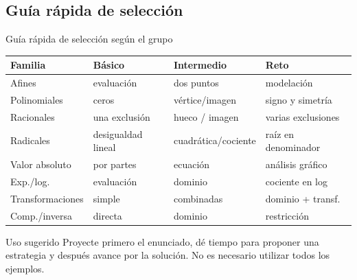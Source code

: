 \documentclass[aspectratio=169,10pt]{beamer}
\begin{document}
\subsection*{Guía rápida de selección}
\begin{frame}{Guía rápida de selección según el grupo}
\small
\begin{tabular}{p{}p{}p{}p{}}
\toprule
\textbf{Familia} & \textbf{Básico} & \textbf{Intermedio} & \textbf{Reto}\\
\midrule
Afines & evaluación & dos puntos & modelación\\
Polinomiales & ceros & vértice/imagen & signo y simetría\\
Racionales & una exclusión & hueco / imagen & varias exclusiones\\
Radicales & desigualdad lineal & cuadrática/cociente & raíz en denominador\\
Valor absoluto & por partes & ecuación & análisis gráfico\\
Exp./log. & evaluación & dominio & cociente en log\\
Transformaciones & simple & combinadas & dominio + transf.\\
Comp./inversa & directa & dominio & restricción\\
\bottomrule
\end{tabular}
\vspace{1ex}
\begin{block}{Uso sugerido}
Proyecte primero el enunciado, dé tiempo para proponer una estrategia y después avance por la solución. No es necesario utilizar todos los ejemplos.
\end{block}
\end{frame}
\end{document}
